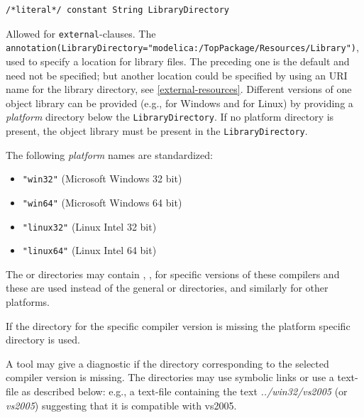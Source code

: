 \begin{annotationdefinition}[LibraryDirectory]
\begin{synopsis}\begin{lstlisting}
/*literal*/ constant String LibraryDirectory
\end{lstlisting}\end{synopsis}
\begin{semantics}
Allowed for {\lstinline!external!}-clauses.
The {\lstinline!annotation(LibraryDirectory="modelica:/TopPackage/Resources/Library")!}, used to specify a location for library files.
The preceding one is the default and need not be specified; but another location could be specified by using an URI name for the library directory, see \cref{external-resources}.
Different versions of one object library can be provided (e.g., for Windows and for Linux) by providing a \emph{platform} directory below the {\lstinline!LibraryDirectory!}.
If no platform directory is present, the object library must be present in the {\lstinline!LibraryDirectory!}.

The following \emph{platform} names are standardized:
\begin{itemize}
\item
  {\lstinline!"win32"!} (Microsoft Windows 32 bit)
\item
  {\lstinline!"win64"!} (Microsoft Windows 64 bit)
\item
  {\lstinline!"linux32"!} (Linux Intel 32 bit)
\item
  {\lstinline!"linux64"!} (Linux Intel 64 bit)
\end{itemize}

The  or  directories may contain , ,  for specific versions of these compilers and these are used instead of the general  or  directories, and similarly for other platforms.

If the directory for the specific compiler version is missing the platform specific directory is used.

\begin{nonnormative}
A tool may give a diagnostic if the directory corresponding to the selected compiler version is missing.
The directories may use symbolic links or use a text-file as described below: e.g., a text-file  containing the text \emph{../win32/vs2005} (or \emph{vs2005}) suggesting that it is compatible with vs2005.
\end{nonnormative}
\end{semantics}
\end{annotationdefinition}

